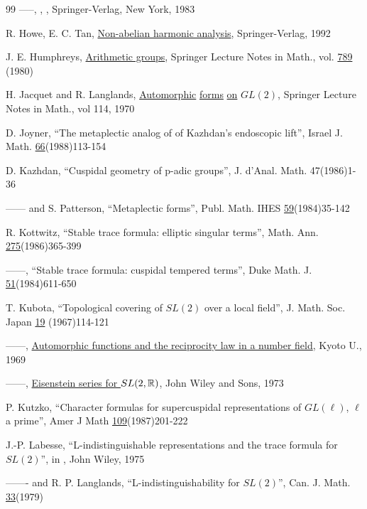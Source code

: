 \begin{thebibliography}{99}
 -----,  
  
 , ,
Springer-Verlag, New York, 1983

 R. Howe, E. C. Tan,
\underline{Non-abelian harmonic analysis}, Springer-Verlag, 1992

 J. E. Humphreys, \underline{Arithmetic groups}, Springer 
Lecture Notes
in Math., vol. \underline{789} (1980)

 H. Jacquet and R. Langlands,
\underline{Automorphic} \underline{forms}
\underline{on} \underline{$GL(2)$}, Springer Lecture Notes in Math.,
vol 114, 1970

 D. Joyner, ``The metaplectic analog of of Kazhdan's 
endoscopic lift'',
Israel J. Math. \underline{66}(1988)113-154

 D. Kazhdan,
``Cuspidal geometry of p-adic groups'', J. d'Anal. Math.
47(1986)1-36

 ------ and  S. Patterson, ``Metaplectic forms'', 
Publ. Math. IHES
\underline{59}(1984)35-142

 R. Kottwitz, ``Stable trace formula: elliptic singular 
terms'', Math.
Ann. \underline{275}(1986)365-399

 ------, ``Stable trace formula: cuspidal tempered terms'', 
Duke Math.
J. \underline{51}(1984)611-650

 T. Kubota, ``Topological covering of $SL(2)$ over a 
local field'', J.
Math. Soc. Japan \underline{19} (1967)114-121

 ------, \underline{Automorphic functions and the reciprocity 
law in a number field}, Kyoto U., 1969

 ------, \underline{Eisenstein series for $SL(2,\Bbb{R})$}, 
John Wiley and Sons, 1973

 P. Kutzko,
``Character formulas for supercuspidal representations of
$GL(\ell)$, $\ell$ a prime'', Amer J Math \underline{109}(1987)201-222

 J.-P. Labesse, ``L-indistinguishable representations
and the trace formula for $SL(2)$'', in
, John Wiley, 1975 

 ------- and R. P. Langlands,
``L-indistinguishability for 
$SL(2)$'', Can. J. Math. \underline{33}(1979)


\end{thebibliography}
